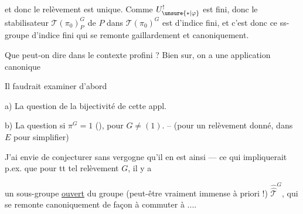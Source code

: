 et donc le relèvement est unique. Comme
$U^{!}_{\unsure{*|\varphi}}$ est fini, donc le stabilisateur
$\mathcal T(\pi_0)^G_P$ de $P$ dans
$\mathcal T(\pi_0)^G$ est d'indice fini,
et c'est donc ce ss-groupe d'indice fini qui se remonte
gaillardement et canoniquement.

Que peut-on dire dans le contexte profini ? Bien sur,
on a une application canonique

Il faudrait examiner d'abord

a) La question de la bijectivité de cette appl.

b) La question si $\pi^G=1$ (),
pour $G\ne(1)$. -- (pour un relèvement donné,
dans $E$ pour simplifier)

J'ai envie de conjecturer sans vergogne
qu'il en est ainsi --- ce qui impliquerait
p.ex. que pour tt tel relèvement $G$, il y a


un sous-groupe \uline{ouvert}  du groupe (peut-être vraiment immense à priori !) $\widehat{\widehat{\mathcal T}}^{G}$, qui se remonte canoniquement de façon à commuter à ....

